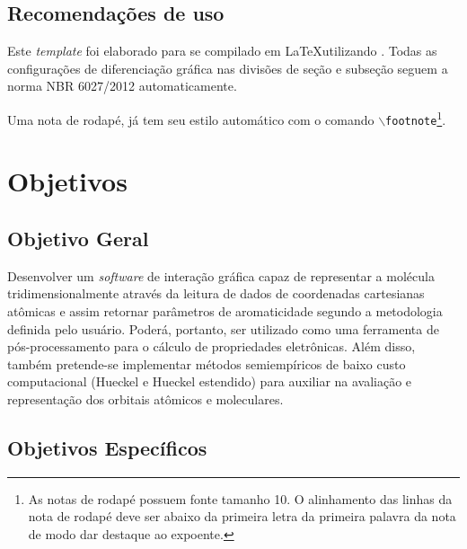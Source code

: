 \section{Recomendações de uso}

Este \emph{template} foi elaborado para se compilado em \LaTeX utilizando \abnTeX.  Todas as configurações de diferenciação gráfica nas divisões de seção e subseção seguem a  norma NBR 6027/2012 automaticamente. 

Uma nota de rodapé, já tem seu estilo automático com o comando \texttt{$\backslash$footnote}\footnote{As notas de rodapé possuem fonte tamanho 10. O alinhamento das linhas da nota de rodapé deve ser abaixo da primeira letra da primeira palavra da nota de modo dar destaque ao expoente.}.


\chapter{Objetivos}

\section{Objetivo Geral}

 Desenvolver um \textit{software} de interação gráfica capaz de representar a molécula tridimensionalmente através da leitura de dados de coordenadas cartesianas atômicas e assim retornar parâmetros de aromaticidade segundo a metodologia definida pelo usuário. Poderá, portanto, ser utilizado como uma ferramenta de pós-processamento para o cálculo de propriedades eletrônicas. Além disso, também pretende-se implementar métodos semiempíricos de baixo custo computacional (Hueckel e Hueckel estendido) para auxiliar na avaliação e representação dos orbitais atômicos e moleculares.

\section{Objetivos Específicos}


